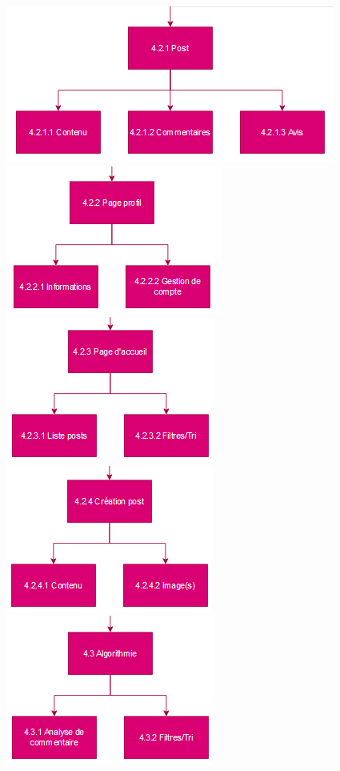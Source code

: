 \documentclass{article}
\begin{document}
\includegraphics[scale=0.75]{6.png} \\
\includegraphics[scale=0.75]{7.png} 
\includegraphics[scale=0.75]{8.png} 
\includegraphics[scale=0.75]{9.png} \\
\includegraphics[scale=0.75]{10.png} 
\end{document}
